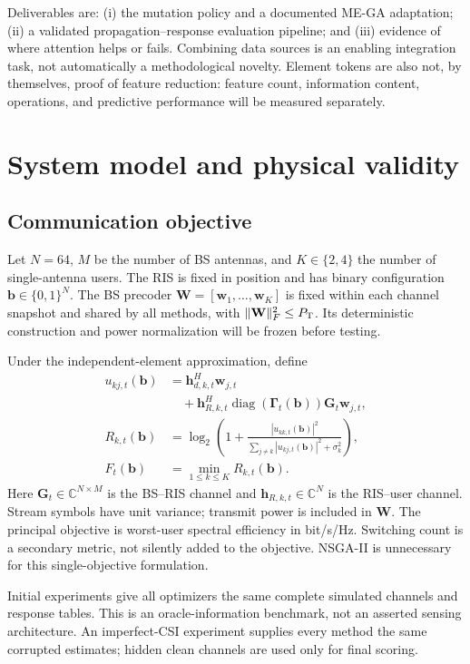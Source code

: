 \documentclass[conference]{IEEEtran}
\newcommand{\bvec}{\mathbf b}
\begin{document}
Deliverables are: (i) the mutation policy and a documented ME-GA adaptation; (ii) a validated propagation--response evaluation pipeline; and (iii) evidence of where attention helps or fails. Combining data sources is an enabling integration task, not automatically a methodological novelty. Element tokens are also not, by themselves, proof of feature reduction: feature count, information content, operations, and predictive performance will be measured separately.

\section{System model and physical validity}
\subsection{Communication objective}
Let $N=64$, $M$ be the number of BS antennas, and $K\in\{2,4\}$ the number of single-antenna users. The RIS is fixed in position and has binary configuration $\bvec\in\{0,1\}^N$. The BS precoder $\mathbf W=[\mathbf w_1,\ldots,\mathbf w_K]$ is fixed within each channel snapshot and shared by all methods, with $\|\mathbf W\|_F^2\leq P_{\rm T}$. Its deterministic construction and power normalization will be frozen before testing.

Under the independent-element approximation, define
\begin{align}
u_{kj,t}(\bvec)
 &= \mathbf h_{d,k,t}^{H}\mathbf w_{j,t} \nonumber\\
 &\quad +\mathbf h_{R,k,t}^{H}\operatorname{diag}(\boldsymbol\Gamma_t(\bvec))\mathbf G_t\mathbf w_{j,t},\\
R_{k,t}(\bvec)
 &=\log_2\left(1+
 \frac{|u_{kk,t}(\bvec)|^2}
 {\sum_{j\ne k}|u_{kj,t}(\bvec)|^2+\sigma_k^2}\right),\\
F_t(\bvec)&=\min_{1\leq k\leq K}R_{k,t}(\bvec).
\end{align}
Here $\mathbf G_t\in\mathbb C^{N\times M}$ is the BS--RIS channel and $\mathbf h_{R,k,t}\in\mathbb C^N$ is the RIS--user channel. Stream symbols have unit variance; transmit power is included in $\mathbf W$. The principal objective is worst-user spectral efficiency in bit/s/Hz. Switching count is a secondary metric, not silently added to the objective. NSGA-II is unnecessary for this single-objective formulation.

Initial experiments give all optimizers the same complete simulated channels and response tables. This is an oracle-information benchmark, not an asserted sensing architecture. An imperfect-CSI experiment supplies every method the same corrupted estimates; hidden clean channels are used only for final scoring.
\end{document}
